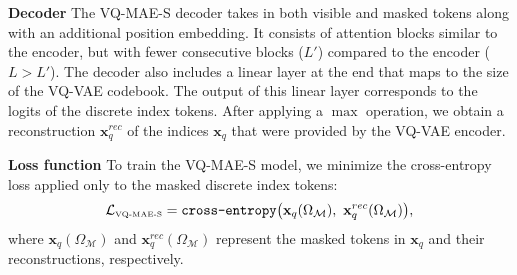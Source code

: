 \documentclass{article}
\newcommand{\myparagraph}[1]{\noindent\textbf{#1}\hspace{.25cm}}
\begin{document}
\myparagraph{Decoder} The VQ-MAE-S decoder takes in both visible and masked tokens along with an additional position embedding. It consists of attention blocks similar to the encoder, but with fewer consecutive blocks ($L'$) compared to the encoder ($L > L'$). The decoder also includes a linear layer at the end that maps to the size of the VQ-VAE codebook. The output of this linear layer corresponds to the logits of the discrete index tokens. After applying a $\max$ operation, we obtain a reconstruction $\mathbf{x}_q^{rec}$ of the indices $\mathbf{x}_q$ that were provided by the VQ-VAE encoder.

\myparagraph{Loss function} To train the VQ-MAE-S model, we minimize the cross-entropy loss applied only to the masked discrete index tokens:
\begin{equation}
    \mathcal{L}_{\text{\tiny{VQ-MAE-S}}} = \texttt{cross-entropy}\big(\mathbf{x}_q(\Omega_\mathcal{M}),~ \mathbf{x}_q^{rec}(\Omega_\mathcal{M})\big),
\end{equation}
where $\mathbf{x}_q(\Omega_\mathcal{M})$ and $\mathbf{x}_q^{rec}(\Omega_\mathcal{M})$ represent the masked tokens in $\mathbf{x}_q$ and their reconstructions, respectively.
\end{document}
